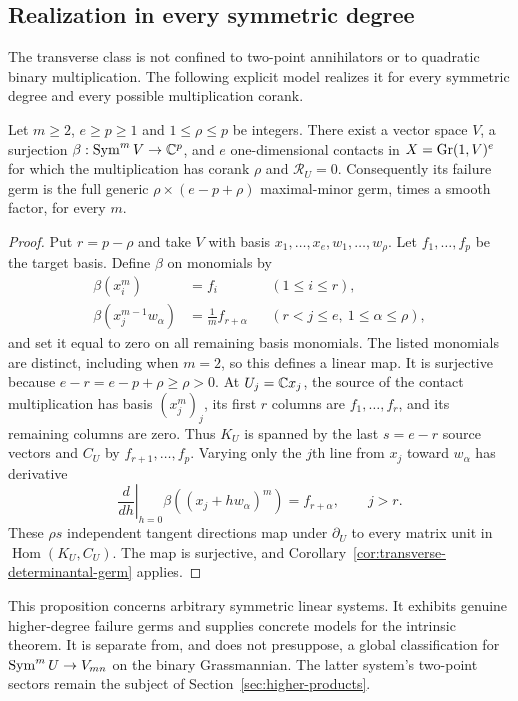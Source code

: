 \subsection{Realization in every symmetric degree}
The transverse class is not confined to two-point annihilators or
to quadratic binary multiplication. The following explicit model
realizes it for every symmetric degree and every possible
multiplication corank.

\begin{proposition}
\label{prop:every-degree-realization}
Let $m\ge2$, $e\ge p\ge1$ and $1\le\rho\le p$ be integers.
There exist a vector space $V$, a surjection
$\beta:\operatorname{Sym}^mV\to\mathbb C^p$, and $e$ one-dimensional contacts in
$X=\operatorname{Gr}(1,V)^e$ for which the multiplication has corank $\rho$
and $\mathcal R_U=0$. Consequently its failure germ is the full
generic $\rho\times(e-p+\rho)$ maximal-minor germ, times a
smooth factor, for every $m$.
\end{proposition}
\begin{proof}
Put $r=p-\rho$ and take $V$ with basis
$x_1,\ldots,x_e,w_1,\ldots,w_\rho$. Let
$f_1,\ldots,f_p$ be the target basis. Define $\beta$ on monomials by
\begin{equation}\label{eq:every-degree-realization}
 \begin{aligned}
 \beta(x_i^m)&=f_i &&(1\le i\le r),\\
 \beta(x_j^{m-1}w_\alpha)&=\frac1m f_{r+\alpha}
                         &&(r<j\le e,\ 1\le\alpha\le\rho),
 \end{aligned}
\end{equation}
and set it equal to zero on all remaining basis monomials. The
listed monomials are distinct, including when $m=2$, so this defines
a linear map. It is surjective because $e-r=e-p+\rho\ge\rho>0$.
At $U_j=\mathbb C x_j$, the source of the contact multiplication has basis
$(x_j^m)_j$, its first $r$ columns are $f_1,\ldots,f_r$, and its
remaining columns are zero. Thus $K_U$ is spanned by the last
$s=e-r$ source vectors and $C_U$ by $f_{r+1},\ldots,f_p$.
Varying only the $j$th line from $x_j$ toward $w_\alpha$ has derivative
\[
 \left.\frac{d}{dh}\right|_{h=0}
       \beta((x_j+hw_\alpha)^m)=f_{r+\alpha},\qquad j>r.
\]
These $\rho s$ independent tangent directions map under
$\partial_U$ to every matrix unit in $\operatorname{Hom}(K_U,C_U)$.
The map is surjective, and Corollary~\ref{cor:transverse-determinantal-germ}
applies.
\end{proof}
This proposition concerns arbitrary symmetric linear systems. It
exhibits genuine higher-degree failure germs and supplies concrete
models for the intrinsic theorem. It is separate from, and does not
presuppose, a global classification for $\operatorname{Sym}^mU\to V_{mn}$ on the
binary Grassmannian. The latter system's two-point sectors remain
the subject of Section~\ref{sec:higher-products}.

